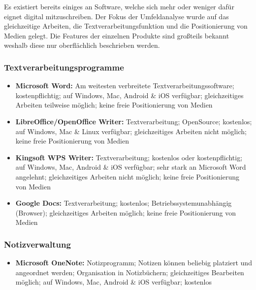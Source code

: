 
Es existiert bereits einiges an Software, welche sich mehr oder weniger dafür eignet digital mitzuschreiben. Der Fokus der Umfeldanalyse wurde auf das gleichzeitige Arbeiten, die Textverarbeitungsfunktion und die Positionierung von Medien gelegt. Die Features der einzelnen Produkte sind großteils bekannt weshalb diese nur oberflächlich beschrieben werden.

\subsubsection{Textverarbeitungsprogramme}
\begin{itemize}
\item \textbf{Microsoft Word:} Am weitesten verbreitete Textverarbeitungssoftware; kostenpflichtig; auf Windows, Mac, Android \& iOS verfügbar; gleichzeitiges Arbeiten teilweise möglich; keine freie Positionierung von Medien
\item \textbf{LibreOffice/OpenOffice Writer:} Textverarbeitung; OpenSource; kostenlos; auf Windows, Mac \& Linux verfügbar; gleichzeitiges Arbeiten nicht möglich; keine freie Positionierung von Medien
\item \textbf{Kingsoft WPS Writer:} Textverarbeitung; kostenlos oder kostenpflichtig; auf Windows, Mac, Android \& iOS verfügbar; sehr stark an Microsoft Word angelehnt; gleichzeitiges Arbeiten nicht möglich; keine freie Positionierung von Medien
\item \textbf{Google Docs:} Textverarbeitung; kostenlos; Betriebssystemunabhängig (Browser); gleichzeitiges Arbeiten möglich; keine freie Positionierung von Medien
\end{itemize}

\subsubsection{Notizverwaltung}
\begin{itemize}
\item \textbf{Microsoft OneNote:} Notizprogramm; Notizen können beliebig platziert und angeordnet werden; Organisation in Notizbüchern; gleichzeitiges Bearbeiten möglich; auf Windows, Mac, Android \& iOS verfügbar; kostenlos
\end{itemize}